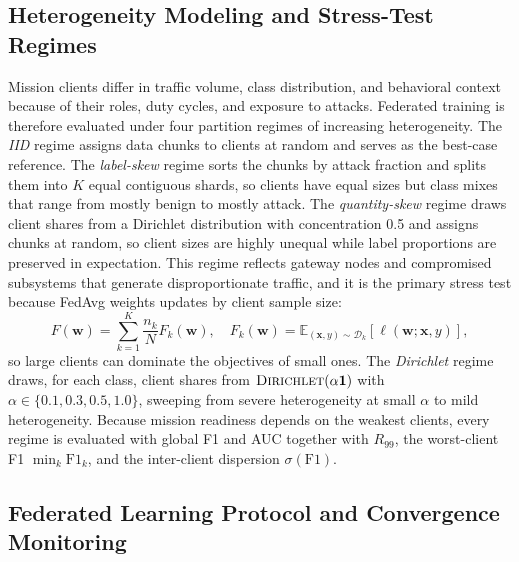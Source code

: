 \documentclass[conference]{IEEEtran}
\begin{document}
\subsection{Heterogeneity Modeling and Stress-Test Regimes}
\label{subsec:heterogeneity_modeling}

Mission clients differ in traffic volume, class distribution, and
behavioral context because of their roles, duty cycles, and exposure
to attacks. Federated training is therefore evaluated under four
partition regimes of increasing heterogeneity.
The \textit{IID} regime assigns data chunks
to clients at random and serves as the best-case reference. The
\textit{label-skew} regime sorts the chunks by attack fraction and
splits them into $K$ equal contiguous shards, so clients have equal
sizes but class mixes that range from mostly benign to mostly attack.
The \textit{quantity-skew} regime draws client shares from a
Dirichlet distribution with concentration 0.5 and assigns chunks at
random, so client sizes are highly unequal while label proportions
are preserved in expectation. This regime reflects gateway nodes and
compromised subsystems that generate disproportionate traffic, and it
is the primary stress test because FedAvg weights updates by client
sample size:
\begin{equation}
F(\mathbf{w})=\sum_{k=1}^{K}\frac{n_k}{N}F_k(\mathbf{w}),\quad
F_k(\mathbf{w})=\mathbb{E}_{(\mathbf{x},y)\sim\mathcal{D}_k}
[\ell(\mathbf{w};\mathbf{x},y)],
\label{eq:fedavg_weighted_obj}
\end{equation}
so large clients can dominate the objectives of small ones.
The \textit{Dirichlet} regime draws, for
each class, client shares from $\textsc{Dirichlet}(\alpha\mathbf{1})$
with $\alpha\in\{0.1,0.3,0.5,1.0\}$, sweeping from severe heterogeneity
at small $\alpha$ to mild heterogeneity. Because mission readiness
depends on the weakest clients, every regime is evaluated with global
F1 and AUC together with $R_{99}$, the worst-client F1
$\min_k\mathrm{F1}_k$, and the inter-client dispersion
$\sigma(\mathrm{F1})$.

\subsection{Federated Learning Protocol and Convergence
            Monitoring}
\label{subsec:federated_protocol_convergence}
\end{document}
